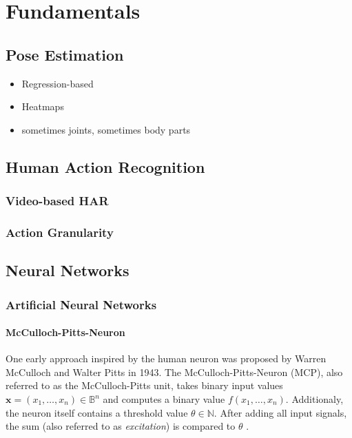 \chapter{Fundamentals}

\section{Pose Estimation}
\begin{itemize}
    \item Regression-based
    \item Heatmaps
    \item sometimes joints, sometimes body parts
\end{itemize}

\section{Human Action Recognition}

\subsection{Video-based HAR}

\subsection{Action Granularity}

\section{Neural Networks}

\subsection{Artificial Neural Networks}

\subsubsection{McCulloch-Pitts-Neuron}
One early approach inspired by the human neuron was proposed by Warren McCulloch and Walter Pitts in 1943.
The McCulloch-Pitts-Neuron (MCP), also referred to as the McCulloch-Pitts unit, takes binary input values $\bm{x} = (x_1, \dots, x_n) \in \mathbb{B}^n$ and computes a binary value $f(x_1, \dots, x_n)$.
Additionaly, the neuron itself contains a threshold value $\theta \in \mathbb{N}$.
After adding all input signals, the sum (also referred to as \textit{excitation}) is compared to $\theta$ .

